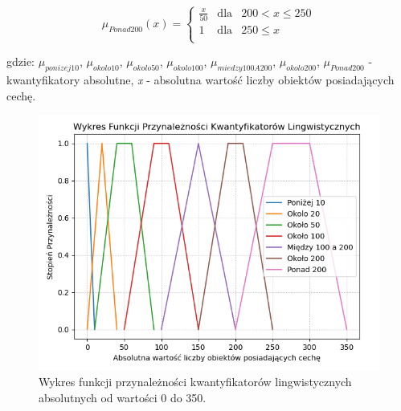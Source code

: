 \documentclass{classrep}
\begin{document}
\begin{equation}
\mu _{Ponad200}(x) =  \left\{ \begin{array}{rcl}
\frac{x}{50} & \mbox{dla} & 200 < x \leq 250\\
1 & \mbox{dla} & 250 \leq x\\
\end{array}\right.
\end{equation}

gdzie: \(\mu _{ponizej10}\), \(\mu _{okolo10}\), \(\mu _{okolo50}\), \(\mu _{okolo100}\), \(\mu _{miedzy100A200}\), \(\mu _{okolo200}\), \(\mu _{Ponad200}\)  - kwantyfikatory absolutne, \textit{x} - absolutna wartość liczby obiektów posiadających cechę. 

\begin{figure}[h!]
 \centering
 \includegraphics[width=14cm]{kwantyfikatory_absolutny_2.png}
 \vspace{-0.3cm}
 \caption{Wykres funkcji przynależności kwantyfikatorów lingwistycznych absolutnych od wartości 0 do 350. }
 \label{kwantyfikatory_lingwistyczne_absolutne}
\end{figure}
\end{document}
